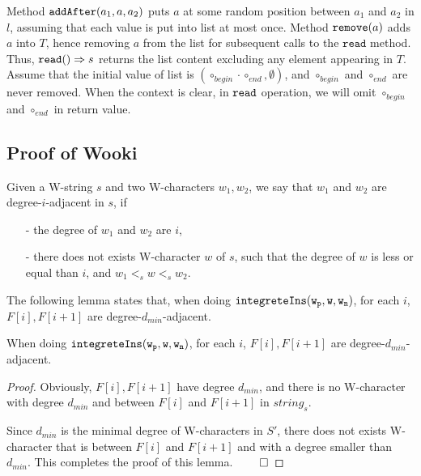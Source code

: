 Method $\alabelshort[\mathtt{addAfter}]{a_1,a,a_2}$ puts $a$ at some random position between $a_1$ and $a_2$ in $l$, assuming that each value is put into list at most once. Method $\alabelshort[\mathtt{remove}]{a}$ adds $a$ into $T$, hence removing $a$ from the list for subsequent calls to the $\mathtt{read}$ method. Thus, $\alabellong[\mathtt{read}]{}{s}{}$ returns the list content excluding any element appearing in $T$. Assume that the initial value of list is $(\circ_{begin} \cdot \circ_{end},\emptyset)$, and $\circ_{begin}$ and $\circ_{end}$ are never removed. When the context is clear, in $\ensuremath{\tt read}$ operation, we will omit $\circ_{begin}$ and $\circ_{end}$ in return value.




\subsection{Proof of Wooki}
\label{subsec:proof of Wooki}


Given a W-string $s$ and two W-characters $w_1,w_2$, we say that $w_1$ and $w_2$ are degree-$i$-adjacent in $s$, if

\begin{itemize}
\setlength{\itemsep}{0.5pt}
\item[-] the degree of $w_1$ and $w_2$ are $i$,

\item[-] there does not exists W-character $w$ of $s$, such that the degree of $w$ is less or equal than $i$, and $w_1 <_s w <_s w_2$.
\end{itemize}


The following lemma states that, when doing $\alabelshort[{\tt integreteIns}]{w_p,w,w_n}$, for each $i$, $F[i],F[i+1]$ are degree-$d_{min}$-adjacent.

\begin{lemma}
\label{lemma:in F of Wooki, W-characters are degree-dmin-adjacent}
When doing $\alabelshort[{\tt integreteIns}]{w_p,w,w_n}$, for each $i$, $F[i],F[i+1]$ are degree-$d_{min}$-adjacent.
\end{lemma}

\begin {proof}
Obviously, $F[i],F[i+1]$ have degree $d_{min}$, and there is no W-character with degree $d_{min}$ and between $F[i]$ and $F[i+1]$ in $string_s$.

Since $d_{min}$ is the minimal degree of W-characters in $S'$, there does not exists W-character that is between $F[i]$ and $F[i+1]$ and with a degree smaller than $d_{min}$. This completes the proof of this lemma. $\qed$
\end {proof}


